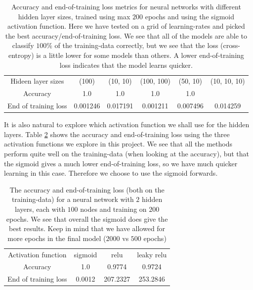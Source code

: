 \documentclass{article}
\begin{document}
\begin{table}
      \centering
      \begin{tabular}{| c | c | c | c | c | c |}
            Hideen layer sizes   & (100)    & (10, 10) & (100, 100) & (50, 10) & (10, 10, 10) \\
            Accuracy             & 1.0      & 1.0      & 1.0        & 1.0                     \\
            End of training loss & 0.001246 & 0.017191 & 0.001211   & 0.007496 & 0.014259     \\
      \end{tabular}
      \caption{Accuracy and end-of-training loss metrics for neural networks
            with different hidden layer sizes, trained using max $200$ epochs and
            using the sigmoid activation function. Here we have tested on a grid of
            learning-rates and picked the best accuracy/end-of-training loss. We see
            that all of the models are able to classify $100\%$ of the training-data
            correctly, but we see that the loss (cross-entropy) is a little lower for
            some models than others. A lower end-of-training loss indicates that the
            model learns quicker.}
      \label{breastcancer-nn-hidden-layers}
\end{table}

It is also natural to explore which activation function we shall use for the
hidden layers. Table \ref{breastcancer-nn-activ-funcs} shows the accuracy and
end-of-training loss using the three activation functions we explore in this
project. We see that all the methods perform quite well on the training-data
(when looking at the accuracy), but that the sigmoid gives a much lower
end-of-training loss, so we have much quicker learning in this case. Therefore
we choose to use the sigmoid forwards.

\begin{table}
      \centering
      \begin{tabular}{| c | c | c | c |}
            Activation function  & sigmoid & relu     & leaky relu \\
            Accuracy             & 1.0     & 0.9774   & 0.9724     \\
            End of training loss & 0.0012  & 207.2327 & 253.2846   \\
      \end{tabular}
      \caption{The accuracy and end-of-training loss (both on the training-data)
            for a neural network with $2$ hidden layers, each with $100$ nodes and
            training on $200$ epochs. We see that overall the sigmoid does give the
            best results. Keep in mind that we have allowed for more epochs in
            the final model ($2000$ vs $500$ epochs)}
      \label{breastcancer-nn-activ-funcs}
\end{table}
\end{document}
